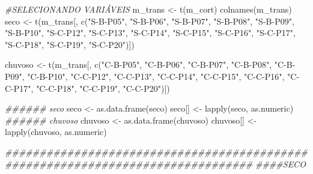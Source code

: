 \documentclass[
  letterpaper,
  DIV=11,
  numbers=noendperiod]{scrartcl}
\newenvironment{Shaded}{}{}
\newcommand{\CommentTok}[1]{\textcolor[rgb]{0.38,0.63,0.69}{\textit{#1}}}
\newcommand{\DocumentationTok}[1]{\textcolor[rgb]{0.73,0.13,0.13}{\textit{#1}}}
\newcommand{\FunctionTok}[1]{\textcolor[rgb]{0.02,0.16,0.49}{#1}}
\newcommand{\NormalTok}[1]{#1}
\newcommand{\OtherTok}[1]{\textcolor[rgb]{0.00,0.44,0.13}{#1}}
\newcommand{\StringTok}[1]{\textcolor[rgb]{0.25,0.44,0.63}{#1}}
\begin{document}
\begin{Shaded}
\begin{Highlighting}[numbers=left,,]
\CommentTok{\#SELECIONANDO VARIÁVEIS}
\NormalTok{m\_trans }\OtherTok{\textless{}{-}} \FunctionTok{t}\NormalTok{(m\_cort)}
\FunctionTok{colnames}\NormalTok{(m\_trans)}
\NormalTok{seco }\OtherTok{\textless{}{-}} \FunctionTok{t}\NormalTok{(m\_trans[, }\FunctionTok{c}\NormalTok{(}\StringTok{"S{-}B{-}P05"}\NormalTok{, }\StringTok{"S{-}B{-}P06"}\NormalTok{, }\StringTok{"S{-}B{-}P07"}\NormalTok{,}
                      \StringTok{"S{-}B{-}P08"}\NormalTok{, }\StringTok{"S{-}B{-}P09"}\NormalTok{, }\StringTok{"S{-}B{-}P10"}\NormalTok{, }
                      \StringTok{"S{-}C{-}P12"}\NormalTok{, }\StringTok{"S{-}C{-}P13"}\NormalTok{, }\StringTok{"S{-}C{-}P14"}\NormalTok{,}
                      \StringTok{"S{-}C{-}P15"}\NormalTok{, }\StringTok{"S{-}C{-}P16"}\NormalTok{, }\StringTok{"S{-}C{-}P17"}\NormalTok{,}
                      \StringTok{"S{-}C{-}P18"}\NormalTok{, }\StringTok{"S{-}C{-}P19"}\NormalTok{, }\StringTok{"S{-}C{-}P20"}\NormalTok{)])}

\NormalTok{chuvoso }\OtherTok{\textless{}{-}} \FunctionTok{t}\NormalTok{(m\_trans[, }\FunctionTok{c}\NormalTok{(}\StringTok{"C{-}B{-}P05"}\NormalTok{, }\StringTok{"C{-}B{-}P06"}\NormalTok{, }\StringTok{"C{-}B{-}P07"}\NormalTok{, }
                         \StringTok{"C{-}B{-}P08"}\NormalTok{, }\StringTok{"C{-}B{-}P09"}\NormalTok{, }\StringTok{"C{-}B{-}P10"}\NormalTok{,}
                         \StringTok{"C{-}C{-}P12"}\NormalTok{, }\StringTok{"C{-}C{-}P13"}\NormalTok{, }\StringTok{"C{-}C{-}P14"}\NormalTok{,}
                         \StringTok{"C{-}C{-}P15"}\NormalTok{, }\StringTok{"C{-}C{-}P16"}\NormalTok{, }\StringTok{"C{-}C{-}P17"}\NormalTok{,}
                         \StringTok{"C{-}C{-}P18"}\NormalTok{, }\StringTok{"C{-}C{-}P19"}\NormalTok{, }\StringTok{"C{-}C{-}P20"}\NormalTok{)])}

\DocumentationTok{\#\#\#\#\#\# seco}
\NormalTok{seco }\OtherTok{\textless{}{-}} \FunctionTok{as.data.frame}\NormalTok{(seco)}
\NormalTok{seco[] }\OtherTok{\textless{}{-}} \FunctionTok{lapply}\NormalTok{(seco, as.numeric)}
\DocumentationTok{\#\#\#\#\#\# chuvoso}
\NormalTok{chuvoso }\OtherTok{\textless{}{-}} \FunctionTok{as.data.frame}\NormalTok{(chuvoso)}
\NormalTok{chuvoso[] }\OtherTok{\textless{}{-}} \FunctionTok{lapply}\NormalTok{(chuvoso, as.numeric)}

\DocumentationTok{\#\#\#\#\#\#\#\#\#\#\#\#\#\#\#\#\#\#\#\#\#\#\#\#\#\#\#\#\#\#\#\#\#\#\#\#\#\#\#\#\#\#\#\#\#\#\#\#\#\#\#\#\#\#\#\#\#\#\#\#\#\#\#\#\#\#\#\#\#\#\#\#\#\#\#\#\#\#\#\#}
\DocumentationTok{\#\#\#\#SECO}


\end{Highlighting}
\end{Shaded}
\end{document}
